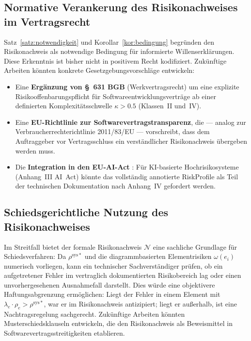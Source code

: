 ﻿\documentclass[a4paper,12pt]{article}
\theoremstyle{definition}
\begin{document}
\subsection{Normative Verankerung des Risikona\-chweis\-es im Vertragsrecht}

Satz~\ref{satz:notwendigkeit} und Korollar~\ref{kor:bedingung} begr\"unden den
Risikonachweis als notwendige Bedingung f\"ur informierte Willenserkl\"arungen.
Diese Erkenntnis ist bisher nicht in positivem Recht kodifiziert. Zuk\"unftige
Arbeiten k\"onnten konkrete Gesetzgebungsvorschl\"age entwickeln:
\begin{itemize}
    \item Eine \textbf{Erg\"anzung von \S~631 BGB} (Werkvertragsrecht) um eine
          explizite Risikooffenbarungspflicht f\"ur Softwareentwicklungsvertr\"age
          ab einer definierten Komplexit\"atsschwelle $\kappa > 0.5$ (Klassen~II
          und~IV).
    \item Eine \textbf{EU-Richtlinie zur Softwarevertragstransparenz}, die ---
          analog zur Verbraucherrechterichtlinie 2011/83/EU --- vorschreibt,
          dass dem Auftraggeber vor Vertragsschluss ein verst\"andlicher
          Risikonachweis \"ubergeben werden muss.
    \item Die \textbf{Integration in den EU-AI-Act} \cite{euai2024}: F\"ur
          KI-basierte Hochrisikosysteme (Anhang~III AI~Act) k\"onnte das
          vollst\"andig annotierte \textsf{RiskProfile} als Teil der technischen
          Dokumentation nach Anhang~IV gefordert werden.
\end{itemize}

\subsection{Schiedsgerichtliche Nutzung des Risikona\-chweis\-es}

Im Streitfall bietet der formale Risikonachweis $\mathcal{N}$ eine sachliche
Grundlage f\"ur Schiedsverfahren: Da $\rho^{\mathrm{sys}*}$ und die diagrammbasierten
Elementrisiken $\omega(e_i)$ numerisch vorliegen, kann ein technischer Sachverst\"andiger
pr\"ufen, ob ein aufgetretener Fehler im vertraglich dokumentierten Risikobereich lag
oder einen unvorhergesehenen Ausnahmefall darstellt. Dies w\"urde eine objektivere
Haftungsabgrenzung erm\"oglichen: Liegt der Fehler in einem Element mit
$\lambda_e \cdot \rho_e > \rho^{\mathrm{sys}*}$, war er im Risikonachweis
antizipiert; liegt er au\ss{}erhalb, ist eine Nachtragsregelung sachgerecht.
Zuk\"unftige Arbeiten k\"onnten Musterschiedsklauseln entwickeln, die den
Risikonachweis als Beweismittel in Softwarevertragsstreitigkeiten etablieren.
\end{document}
